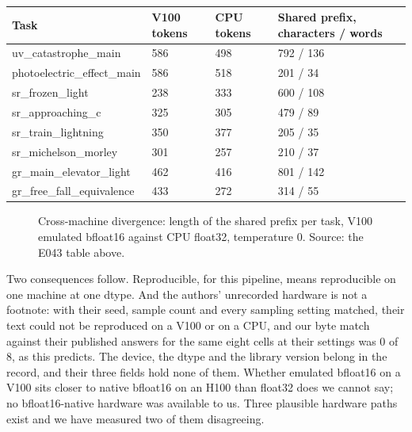 \documentclass[reprint,prx,amsmath,amssymb,aps,superscriptaddress]{revtex4-2}
\begin{document}
\begin{table}[t]
\caption{}
\begin{ruledtabular}
\begin{tabular}{llll}
Task & V100 tokens & CPU tokens & Shared prefix, characters / words \\
\hline
uv\_catastrophe\_main & 586 & 498 & 792 / 136 \\
photoelectric\_effect\_main & 586 & 518 & 201 / 34 \\
sr\_frozen\_light & 238 & 333 & 600 / 108 \\
sr\_approaching\_c & 325 & 305 & 479 / 89 \\
sr\_train\_lightning & 350 & 377 & 205 / 35 \\
sr\_michelson\_morley & 301 & 257 & 210 / 37 \\
gr\_main\_elevator\_light & 462 & 416 & 801 / 142 \\
gr\_free\_fall\_equivalence & 433 & 272 & 314 / 55 \\
\end{tabular}
\end{ruledtabular}
\end{table}



\begin{figure}[t]
\centering
{}
\caption{Cross-machine divergence: length of the shared prefix per task, V100 emulated bfloat16 against CPU float32, temperature 0. Source: the E043 table above.}
\label{fig:1}
\end{figure}

Two consequences follow. Reproducible, for this pipeline, means reproducible on one machine at one dtype. And the authors' unrecorded hardware is not a footnote: with their seed, sample count and every sampling setting matched, their text could not be reproduced on a V100 or on a CPU, and our byte match against their published answers for the same eight cells at their settings was 0 of 8, as this predicts. The device, the dtype and the library version belong in the record, and their three fields hold none of them. Whether emulated bfloat16 on a V100 sits closer to native bfloat16 on an H100 than float32 does we cannot say; no bfloat16-native hardware was available to us. Three plausible hardware paths exist and we have measured two of them disagreeing.
\end{document}
